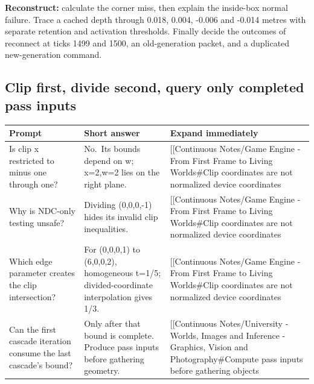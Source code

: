 \textbf{Reconstruct:} calculate the corner miss, then explain the inside-box normal failure. Trace a cached depth through 0.018, 0.004, -0.006 and -0.014 metres with separate retention and activation thresholds. Finally decide the outcomes of reconnect at ticks 1499 and 1500, an old-generation packet, and a duplicated new-generation command.

\subsection{Clip first, divide second, query only completed pass inputs}\label{appendix-64ea716dcadc-clip-first-divide-second-query-only-completed-pass-inputs}

\hypertarget{appendix-64ea716dcadc-clip-first-divide-second-query-only-completed-pass-inputs}{}

{\def\LTcaptype{none} %
\begin{longtable}[]{@{}
  >{\raggedright\arraybackslash}p{}
  >{\raggedright\arraybackslash}p{}
  >{\raggedright\arraybackslash}p{}@{}}
\toprule\noalign{}
\begin{minipage}[b]{\linewidth}\raggedright
Prompt
\end{minipage} & \begin{minipage}[b]{\linewidth}\raggedright
Short answer
\end{minipage} & \begin{minipage}[b]{\linewidth}\raggedright
Expand immediately
\end{minipage} \\
\midrule\noalign{}
\endhead
\bottomrule\noalign{}
\endlastfoot
Is clip x restricted to minus one through one? & No.~Its bounds depend on w; x=2,w=2 lies on the right plane. & {[}{[}Continuous Notes/Game Engine - From First Frame to Living Worlds\#Clip coordinates are not normalized device coordinates \\
Why is NDC-only testing unsafe? & Dividing (0,0,0,-1) hides its invalid clip inequalities. & {[}{[}Continuous Notes/Game Engine - From First Frame to Living Worlds\#Clip coordinates are not normalized device coordinates \\
Which edge parameter creates the clip intersection? & For (0,0,0,1) to (6,0,0,2), homogeneous t=1/5; divided-coordinate interpolation gives 1/3. & {[}{[}Continuous Notes/Game Engine - From First Frame to Living Worlds\#Clip coordinates are not normalized device coordinates \\
Can the first cascade iteration consume the last cascade's bound? & Only after that bound is complete. Produce pass inputs before gathering geometry. & {[}{[}Continuous Notes/University - Worlds, Images and Inference - Graphics, Vision and Photography\#Compute pass inputs before gathering objects \\
\end{longtable}
}

